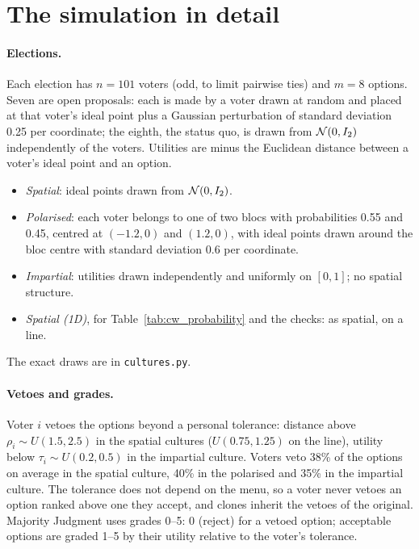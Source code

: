 \section{The simulation in detail}\label{app:simulation}

\paragraph{Elections.} Each election has $n = 101$ voters (odd, to limit pairwise ties) and $m = 8$
options. Seven are open proposals: each is made by a voter drawn at random and placed at that voter's
ideal point plus a Gaussian perturbation of standard deviation 0.25 per coordinate; the eighth, the status
quo, is drawn from $\mathcal{N}(0, I_2)$ independently of the voters. Utilities are minus the Euclidean
distance between a voter's ideal point and an option.
\begin{itemize}
  \item \emph{Spatial}: ideal points drawn from $\mathcal{N}(0, I_2)$.
  \item \emph{Polarised}: each voter belongs to one of two blocs with probabilities 0.55 and 0.45, centred at
  $(-1.2, 0)$ and $(1.2, 0)$, with ideal points drawn around the bloc centre with standard deviation 0.6
  per coordinate.
  \item \emph{Impartial}: utilities drawn independently and uniformly on $[0,1]$; no spatial structure.
  \item \emph{Spatial (1D)}, for Table~\ref{tab:cw_probability} and the checks: as spatial, on a line.
\end{itemize}
The exact draws are in \texttt{cultures.py}.

\paragraph{Vetoes and grades.} Voter $i$ vetoes the options beyond a personal tolerance: distance above
$\rho_i \sim U(1.5, 2.5)$ in the spatial cultures ($U(0.75, 1.25)$ on the line), utility below
$\tau_i \sim U(0.2, 0.5)$ in the impartial culture. Voters veto 38\% of the options on average in the
spatial culture, 40\% in the polarised and 35\% in the impartial culture. The tolerance does not depend
on the menu, so a voter never vetoes an option ranked above one they accept, and clones inherit the
vetoes of the original. Majority Judgment uses grades 0--5: 0 (reject) for a vetoed option; acceptable
options are graded 1--5 by their utility relative to the voter's tolerance.

